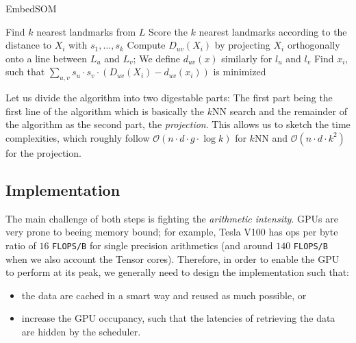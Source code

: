 \begin{algorithm}[t]
	\caption{EmbedSOM}
	\label{alg01:esom}
	\begin{algorithmic}[1]
         
            \State Find $k$ nearest landmarks from $L$
            \State Score the $k$ nearest landmarks according to the distance to $X_i$ with $s_1, \dots, s_k$
             
                \State Compute $D_{uv}(X_i)$ by projecting $X_i$ orthogonally onto a line between $L_u$ and $L_v$; We define $d_{uv}(x)$ similarly for $l_u$ and $l_v$
            \EndFor
            \State Find $x_i$, such that $\sum_{u, v} s_u \cdot s_v \cdot (D_{uv}(X_i) - d_{uv}(x_i))$ is minimized
        \EndFor
		\EndProcedure
	\end{algorithmic}
\end{algorithm}

Let us divide the algorithm into two digestable parts: The first part being the first line of the algorithm which is basically the $k$NN search and the remainder of the algorithm as the second part, the \emph{projection}. This allows us to sketch the time complexities, which roughly follow $\mathcal{O}(n\cdot d \cdot g \cdot \log k)$ for $k$NN and $\mathcal{O}(n\cdot d \cdot k^2)$ for the projection.

\subsection{Implementation}

The main challenge of both steps is fighting the \emph{arithmetic intensity}. GPUs are very prone to beeing memory bound; for example, Tesla V100 has ops per byte ratio of $16$ \texttt{FLOPS/B} for single precision arithmetics (and around $140$ \texttt{FLOPS/B} when we also account the Tensor cores). Therefore, in order to enable the GPU to perform at its peak, we generally need to design the implementation such that:
\begin{itemize}
    \item the data are cached in a smart way and reused as much possible, or
    \item increase the GPU occupancy, such that the latencies of retrieving the data are hidden by the scheduler.
\end{itemize}

